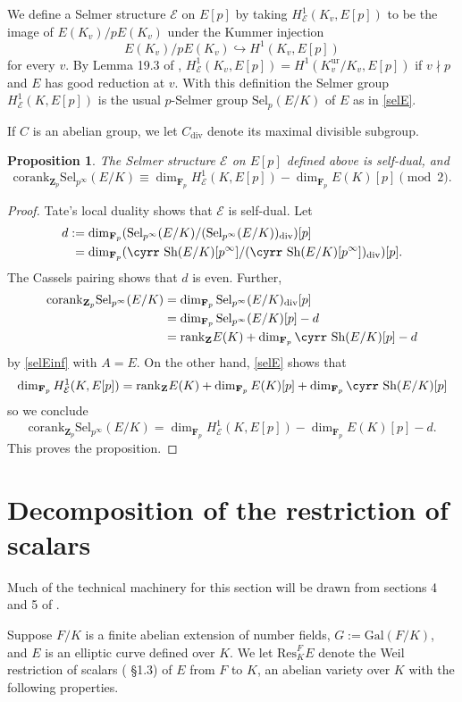\documentclass[reqno]{amsart}
\newtheorem{prop}[thm]{Proposition}
\theoremstyle{definition}
\def\Sh{\mbox{\cyrr Sh}}
\def\Z{\mathbf{Z}}
\def\F{\mathbf{F}}
\def\Zp{\Z_p}
\def\Fp{\F_p}
\def\E{\mathcal{E}}
\def\Gal{\mathrm{Gal}}
\def\rk{\mathrm{rank}}
\def\cork{\mathrm{corank}}
\def\div{\mathrm{div}}
\def\unr{\mathrm{ur}}
\def\Res{\mathrm{Res}}
\def\Sel{\mathrm{Sel}}
\def\hookto{\hookrightarrow}
\def\Hs#1{H^1_{#1}}
\def\HE{\Hs{\E}}
\def\rf{\Fp}
\begin{document}
We define a Selmer structure $\E$ on $E[p]$ by taking 
$\HE(K_v,E[p])$ to be the image of $E(K_v)/p E(K_v)$ under the Kummer injection
$$
E(K_v)/p E(K_v) \hookto H^1(K_v, E[p])
$$
for every $v$.  By Lemma 19.3 of \cite{casexp}, 
$\HE(K_v,E[p]) = H^1(K_v^\unr/K_v,E[p])$ if $v \nmid p$ and 
$E$ has good reduction at $v$.
With this definition the Selmer group $\HE(K,E[p])$ is 
the usual $p$-Selmer group $\Sel_p(E/K)$ of $E$ as in \eqref{selE}.

If $C$ is an abelian group, we let $C_\div$ denote its maximal divisible subgroup.  

\begin{prop}
\label{selfA}
The Selmer structure $\E$ on $E[p]$ defined above is self-dual, and
$$
\cork_{\Zp}\Sel_{p^\infty}(E/K) \equiv \dim_{\rf}\HE(K,E[p]) - \dim_{\rf}E(K)[p] \pmod{2}.
$$  
\end{prop}

\begin{proof}
Tate's local duality \cite{tate} shows that $\E$ is self-dual.  
Let 
\begin{align*}
d &:= \dim_{\rf}(\Sel_{p^\infty}(E/K)/(\Sel_{p^\infty}(E/K))_\div)[p] \\
    &\phantom{:}= \dim_{\rf}(\Sh(E/K)[p^\infty]/(\Sh(E/K)[p^\infty])_\div)[p].
\end{align*}
The Cassels pairing \cite{cassels} shows that $d$ is even.  
Further, 
\begin{align*}
\cork_{\Zp}\Sel_{p^\infty}(E/K) &= \dim_{\rf}\Sel_{p^\infty}(E/K)_\div[p] \\
    &= \dim_{\rf}\Sel_{p^\infty}(E/K)[p] - d \\
    &= \rk_\Z E(K) + \dim_{\rf}\Sh(E/K)[p] - d
\end{align*}
by \eqref{selEinf} with $A = E$.  On the other hand, \eqref{selE} shows that 
$$
\dim_{\rf}\HE(K,E[p]) = \rk_\Z E(K) + \dim_{\rf}E(K)[p] + \dim_{\rf}\Sh(E/K)[p]
$$
so we conclude
$$
\cork_{\Zp}\Sel_{p^\infty}(E/K) = \dim_{\rf}\HE(K,E[p]) - \dim_{\rf}E(K)[p] - d.
$$
This proves the proposition.
\end{proof}


\section{Decomposition of the restriction of scalars}
\label{resn}

Much of the technical machinery for this section will be drawn 
from sections 4 and 5 of \cite{prim}.

Suppose $F/K$ is a finite abelian extension of number fields, 
$G := \Gal(F/K)$, and $E$ is an elliptic curve defined over $K$.  
We let $\Res^F_K E$ denote the Weil restriction of scalars (\cite{weil} \S1.3)
of $E$ from $F$ to $K$, an abelian variety over $K$ 
with the following properties.
\end{document}
